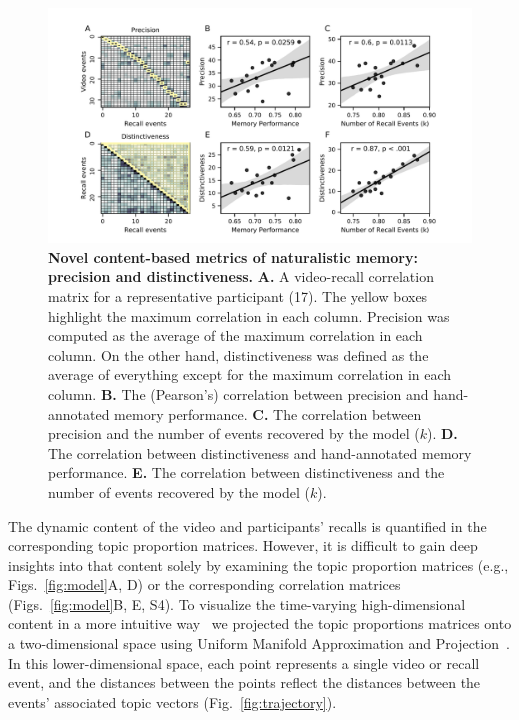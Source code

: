 \documentclass{article}
\newcommand{\corrmats}{S4}
\begin{document}
\begin{figure}[tp]
  \centering
  \includegraphics[width=1\textwidth]{figs/precision_distinctiveness}
  \caption{\small \textbf{Novel content-based metrics of naturalistic memory: precision and distinctiveness.} \textbf{A.} A video-recall correlation matrix for a representative participant (17).  The yellow boxes highlight the maximum correlation in each column.  Precision was computed as the average of the maximum correlation in each column.  On the other hand, distinctiveness was defined as the average of everything except for the maximum correlation in each column. \textbf{B.} The (Pearson's) correlation between precision and hand-annotated memory performance. \textbf{C.} The correlation between precision and the number of events recovered by the model ($k$). \textbf{D.} The correlation between distinctiveness and hand-annotated memory performance. \textbf{E.} The correlation between distinctiveness and the number of events recovered by the model ($k$).}
  \label{fig:precision-distinctiveness}
\end{figure}

The dynamic content of the video and participants' recalls is quantified in the corresponding topic proportion matrices.  However, it is difficult to gain deep insights into that content solely by examining the topic proportion matrices (e.g., Figs.~\ref{fig:model}A, D) or the corresponding correlation matrices (Figs.~\ref{fig:model}B, E, \corrmats).  To visualize the time-varying high-dimensional content in a more intuitive way~\citep{HeusEtal18a} we projected the topic proportions matrices onto a two-dimensional space using Uniform Manifold Approximation and Projection~\citep[UMAP; ][]{McInHeal18}.  In this lower-dimensional space, each point represents a single video or recall event, and the distances between the points reflect the distances between the events' associated topic vectors (Fig.~\ref{fig:trajectory}).
\end{document}
